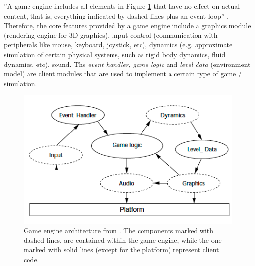 ''A game engine includes all elements in Figure \ref{fig:game_engine_architecture} that have no effect on actual content, that is, everything indicated by dashed lines plus an event loop'' \cite{shantz1998designing}. Therefore, the core features provided by a game engine include a graphics module (rendering engine for 3D graphics), input control (communication with peripherals like mouse, keyboard, joystick, etc), dynamics (e.g. approximate simulation of certain physical systems, such as rigid body dynamics, fluid dynamics, etc), sound. The \emph{event handler}, \emph{game logic} and \emph{level data} (environment model) are client modules that are used to implement a certain type of game / simulation.\\
\begin{figure}[H]
	\centering
	\includegraphics[width=\linewidth]{gfx/Chapter3/game_engine_architecture}
	\caption{Game engine architecture from \cite{shantz1998designing}. The components marked with dashed lines, are contained within the game engine, while the one marked with solid lines (except for the platform) represent client code.}
	\label{fig:game_engine_architecture}
\end{figure}

